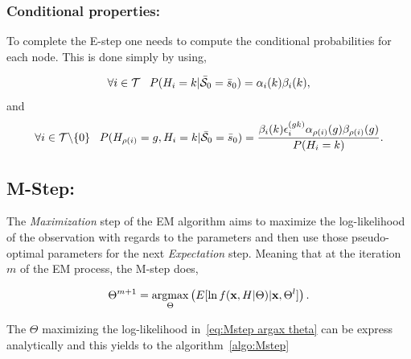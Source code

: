 \documentclass[a4paper,11pt]{report}
\begin{document}
			\subsubsection{Conditional properties:}
				\label{subsubsec:SHMT/Learning/E/Cond}
				
				To complete the E-step one needs to compute the conditional probabilities for each node. This is done simply by using,
				
				\begin{equation}
				  \forall i \in \mathcal{T} \;\;\; P(H_{i}=k | \bar{\mathcal{S}}_{0}=\bar{s}_{0}) = \alpha_{i}(k) \beta_{i}(k),
				  \label{eq:Estep cond proba node}
				\end{equation}
				and
				\begin{equation}
				  \forall i \in \mathcal{T}\backslash\{0\} 
				  \;\;\; P(H_{\rho(i)}=g, H_{i}=k | \bar{\mathcal{S}}_{0}=\bar{s}_{0}) = \frac{\beta_{i}(k)\epsilon_{i}^{(gk)}\alpha_{\rho(i)}(g)\beta_{\rho(i)}(g)}{P(H_{i}=k)}.
				  \label{eq:E-step cond proba and parent}
				\end{equation}
		
		\subsection{M-Step:}
			\label{subsec:SHMT/Learning/M}
			
			The \textit{Maximization} step of the EM algorithm aims to maximize the log-likelihood of the observation with regards to the parameters and then use those pseudo-optimal parameters for the next \textit{Expectation} step. Meaning that at the iteration $m$ of the EM process, the M-step does,
			
			\begin{equation}
				\Theta^{m+1} = \mathop{\rm argmax}_{\Theta} \left(E[\ln f({\bf x},H|\Theta)|{\bf x},\Theta^{l}] \right).
				\label{eq:Mstep argax theta}
			\end{equation}
			
			The $\Theta$ maximizing the log-likelihood in~\ref{eq:Mstep argax theta} can be express analytically and this yields to the algorithm~\ref{algo:Mstep}
			
\end{document}
